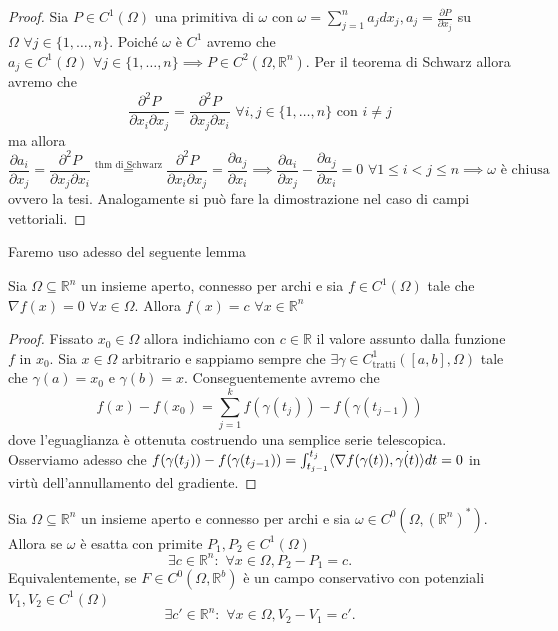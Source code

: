 \begin{proof}
Sia $P \in C^1(\Omega)$ una primitiva di $\omega$ con $\omega = \sum\limits_{j=1}^n a_j dx_j, a_j = \frac{\partial P}{\partial x_j}$ su $\Omega \, \, \forall j \in \{1, \ldots, n \}$. Poiché
$\omega$ è $C^1$ avremo che $a_j \in C^1(\Omega) \, \, \forall j \in \{1, \ldots, n \} \implies P \in C^2(\Omega, \mathbb{R}^n)$. Per il teorema di Schwarz allora avremo che
$$
\frac{\partial^2 P}{\partial x_i \partial x_j} = \frac{\partial^2 P}{\partial x_j \partial x_i} \, \, \forall i, j \in \{1, \ldots, n \} \text{ con } i \neq j
$$
ma allora
$$
\frac{\partial a_i}{\partial x_j} = \frac{\partial^2 P}{\partial x_j \partial x_i} \stackrel{\text{thm di Schwarz}}{=} \frac{\partial^2 P}{\partial x_i \partial x_j} = \frac{\partial a_j}{\partial x_i} \implies \frac{\partial a_i}{\partial x_j} - \frac{\partial a_j}{\partial x_i} = 0 \, \, \forall 1 \leq i < j \leq n \implies \omega \text{ è chiusa }
$$
ovvero la tesi. Analogamente si può fare la dimostrazione nel caso di campi vettoriali.
\end{proof}
Faremo uso adesso del seguente lemma
\begin{lemma}[CF2]
	Sia $\Omega \subseteq \mathbb{R}^n$ un insieme aperto, connesso per archi e sia $f \in C^1(\Omega)$ tale che $\nabla f(x) = 0 \, \, \forall x \in \Omega$. Allora
	$f(x)=c \, \, \forall x \in \mathbb{R}^n$
\end{lemma}
\begin{proof}
	Fissato $x_0 \in \Omega$ allora indichiamo con $c \in \mathbb{R}$ il valore assunto dalla funzione $f$ in $x_0$. Sia $x \in \Omega$ arbitrario e sappiamo sempre che $\exists \gamma \in C^1_\text{tratti}([a, b], \Omega)$ tale che $\gamma(a) = x_0$ e $\gamma(b)=x$.
	Conseguentemente avremo che 
	$$
	f(x)-f(x_0) = \sum_{j=1}^k f(\gamma(t_j)) - f(\gamma(t_{j-1}))
	$$
	dove l'eguaglianza è ottenuta costruendo una semplice serie telescopica. Osserviamo adesso che $f(\gamma(t_j)) - f(\gamma(t_{j-1})) = \int_{t_{j-1}}^{t_j} \langle \nabla f(\gamma(t)), \dot{\gamma(t)} \rangle dt = 0$ in virtù dell'annullamento del gradiente.
\end{proof}
\begin{prop}
	Sia $\Omega \subseteq \mathbb{R}^n$ un insieme aperto e connesso per archi e sia $\omega \in C^0(\Omega, (\mathbb{R}^n)^*)$. Allora se $\omega$ è esatta con primite $P_1, P_2 \in C^1(\Omega)$
	$$
	\exists c \in \mathbb{R}^n : \, \, \forall x \in \Omega, P_2 - P_1 = c.
	$$
	Equivalentemente, se $F \in C^0(\Omega, \mathbb{R}^b)$ è un campo conservativo con potenziali $V_1, V_2 \in C^1(\Omega)$
	$$
	\exists c' \in \mathbb{R}^n : \, \, \forall x \in \Omega, V_2 - V_1 = c'.
	$$
\end{prop}
